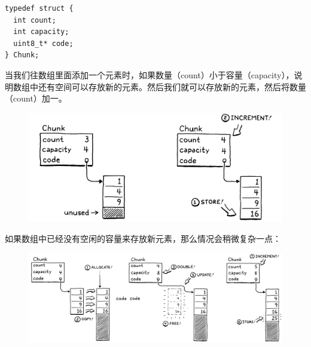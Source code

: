 \documentclass[cn,10pt,math=newtx,citestyle=gb7714-2015,bibstyle=gb7714-2015]{elegantbook}
\newenvironment{code}{\captionsetup{type=listing}}{}
\begin{document}
\begin{code}
\begin{verbatim}
typedef struct {
  int count;
  int capacity;
  uint8_t* code;
} Chunk;
\end{verbatim}
\end{code}

当我们往数组里面添加一个元素时，如果数量（count）小于容量（capacity），说明数组中还有空间可以存放新的元素。然后我们就可以存放新的元素，然后将数量（count）加一。

\begin{figure}[h]
\centering
\includegraphics[width=\textwidth]{image/chunks-of-bytecode/insert.png}
\end{figure}

如果数组中已经没有空闲的容量来存放新元素，那么情况会稍微复杂一点：

\begin{figure}[h]
\centering
\includegraphics[width=\textwidth]{image/chunks-of-bytecode/grow.png}
\end{figure}
\end{document}
